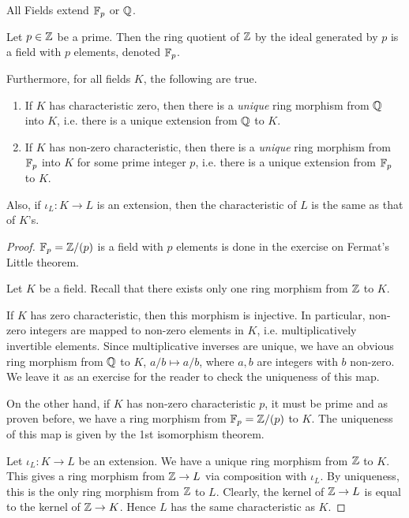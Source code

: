 \documentclass[../book.tex]{subfiles}
\begin{document}
\begin{thm} All Fields extend $\mathbb{F}_p$ or $\mathbb{Q}$.
    
    Let $p \in \mathbb{Z}$ be a prime. 
    Then the ring quotient of $\mathbb{Z}$ by the ideal generated by $p$ 
    is a field with $p$ elements, denoted $\mathbb{F}_p$.
    
    Furthermore, for all fields $K$, the following are true. 
    \begin{enumerate}
        \item If $K$ has characteristic zero, 
        then there is a \emph{unique} ring morphism from $\mathbb{Q}$ into $K$,
        i.e. there is a unique extension from $\mathbb{Q}$ to $K$.
        \item If $K$ has non-zero characteristic,
        then there is a \emph{unique} ring morphism from $\mathbb{F}_p$ into $K$
        for some prime integer $p$,
        i.e. there is a unique extension from $\mathbb{F}_p$ to $K$.
    \end{enumerate}
    Also, if $\iota_L : K \to L$ is an extension,
    then the characteristic of $L$ is the same as that of $K$'s.
    
\end{thm}
\begin{proof}
    
    $\mathbb{F}_p = \mathbb{Z} / (p) $ is a field with $p$ elements is done 
    in the exercise on Fermat's Little theorem.
    
    Let $K$ be a field. 
    Recall that there exists only one ring morphism from $\mathbb{Z}$ to $K$. 
    
    If $K$ has zero characteristic, then this morphism is injective.
    In particular, non-zero integers are mapped to non-zero elements in $K$,
    i.e. multiplicatively invertible elements. 
    Since multiplicative inverses are unique, 
    we have an obvious ring morphism from $\mathbb{Q}$ to $K$, 
    $a / b \mapsto a / b$, where $a, b$ are integers with $b$ non-zero. 
    We leave it as an exercise for the reader to check the uniqueness of this map.
    
    On the other hand, if $K$ has non-zero characteristic $p$, it must be prime
    and as proven before, we have a ring morphism from $\mathbb{F}_p = \mathbb{Z} / (p)$ to $K$.
    The uniqueness of this map is given by the 1st isomorphism theorem.
    
    Let $\iota_L : K \to L$ be an extension.
    We have a unique ring morphism from $\mathbb{Z}$ to $K$.
    This gives a ring morphism from $\mathbb{Z} \to L$ via composition with $\iota_L$.
    By uniqueness, this is the only ring morphism from $\mathbb{Z}$ to $L$.
    Clearly, the kernel of $\mathbb{Z} \to L$ is equal to the kernel of $\mathbb{Z} \to K$.
    Hence $L$ has the same characteristic as $K$.
    
\end{proof}
\end{document}
